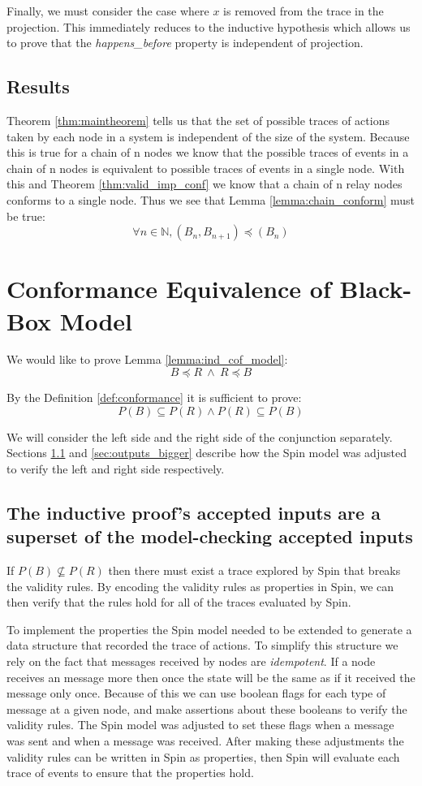 \documentclass[runningheads]{llncs}
\begin{document}
Finally, we must consider the case where $x$ is removed from the trace in the projection. This immediately reduces to the inductive hypothesis which allows us to prove that the \emph{happens\_before} property is independent of projection.

\subsection{Results}
Theorem \ref{thm:maintheorem} tells us that the set of possible traces of actions taken by each node in a system is independent of the size of the system. Because this is true for a chain of n nodes we know that the possible traces of events in a chain of n nodes is equivalent to possible traces of events in a single node. With this and Theorem \ref{thm:valid_imp_conf} we know that a chain of n relay nodes conforms to a single node.
Thus we see that Lemma \ref{lemma:chain_conform} must be true:
$$\forall n \in \mathds{N}, (B_n, B_{n+1}) \preceq (B_n)
$$


\section{Conformance Equivalence of Black-Box Model}
\label{sec:inputs_map}
We would like to prove Lemma \ref{lemma:ind_cof_model}:
$$B \preceq R\ 
\wedge\ 
R \preceq B$$

By the Definition \ref{def:conformance} it is sufficient to prove:
$$P(B) \subseteq P(R) \wedge P(R) \subseteq P(B)$$

We will consider the left side and the right side of the conjunction separately. 
Sections \ref{sec:inputs_smaller} and \ref{sec:outputs_bigger} describe how the Spin model was adjusted to verify the left and right side respectively.

\subsection{The inductive proof's accepted inputs are a superset of the model-checking accepted inputs}
\label{sec:inputs_smaller}
If $P(B) \nsubseteq P(R)$ then there must exist a trace explored by Spin that breaks the validity rules. By encoding the validity rules as properties in Spin, we can then verify that the rules hold for all of the traces evaluated by Spin. 

To implement the properties the Spin model needed to be extended to generate a data structure that recorded the trace of actions. To simplify this structure we rely on the fact that messages received by nodes are \emph{idempotent}. If a node receives an message more then once the state will be the same as if it received the message only once. Because of this we can use boolean flags for each type of message at a given node, and make assertions about these booleans to verify the validity rules. The Spin model was adjusted to set these flags when a message was sent and when a message was received. 
After making these adjustments the validity rules can be written in Spin as properties, then Spin will evaluate each trace of events to ensure that the properties hold. 
\end{document}
